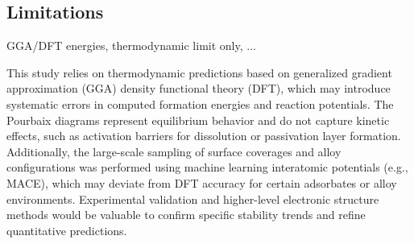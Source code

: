 \documentclass[journal=jacsat,manuscript=article]{achemso}
\begin{document}




\subsection{Limitations}
GGA/DFT energies, thermodynamic limit only, ...

This study relies on thermodynamic predictions based on generalized gradient approximation (GGA) density functional theory (DFT), which may introduce systematic errors in computed formation energies and reaction potentials. The Pourbaix diagrams represent equilibrium behavior and do not capture kinetic effects, such as activation barriers for dissolution or passivation layer formation. Additionally, the large-scale sampling of surface coverages and alloy configurations was performed using machine learning interatomic potentials (e.g., MACE), which may deviate from DFT accuracy for certain adsorbates or alloy environments. Experimental validation and higher-level electronic structure methods would be valuable to confirm specific stability trends and refine quantitative predictions.



\end{document}
